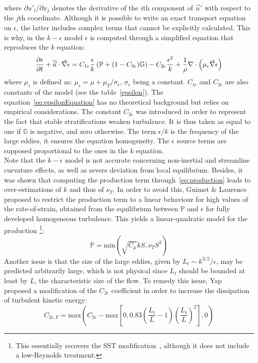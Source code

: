 where $\partial u'_i/\partial x_j$  denotes the derivative of the $i$th component of $\vec u'$ with respect to the $j$th coordinate.
Although it is possible to write an exact transport equation on $\epsilon$, the latter includes complex terms that cannot be explicitly calculated.
This is why, in the $k-\epsilon$ model $\epsilon$ is computed through a simplified equation that reproduces the $k$ equation:
\begin{equation}\label{eq:epsilonEquation}
  \dfrac{\partial\epsilon}{\partial t}+\overline{\vec{u}}\cdot \vec \nabla \epsilon =
C_{1\epsilon}\dfrac{\epsilon}{k}\left(\mathbb P+(1-C_{3\epsilon})\mathbb G\right)  -C_{2\epsilon}\dfrac{\epsilon^2}{k}
+ \dfrac{1}{\rho}\nabla \cdot \left(\mu_\epsilon \vec \nabla \epsilon\right)
\end{equation}
where $\mu_\epsilon$ is defined as: $\mu_\epsilon = \mu+\mu_T/\sigma_\epsilon$, $\sigma_\epsilon$ being a constant.
$C_{1\epsilon}$ and $C_{2\epsilon}$ are also constants of the model (see the table~\ref{epsilon}).
The equation~\eqref{eq:epsilonEquation} has no theoretical background but relies on empirical considerations. The constant $C_{3\epsilon}$ was introduced in order to represent the fact that stable stratifications
weaken turbulence. It is thus taken as equal to one if $\mathbb G$ is negative, and zero otherwise.
The term $\epsilon/k$ is the frequency of the large eddies, it ensures the equation homogeneity.
The $\epsilon$ source terms are supposed proportional to the ones in the $k$ equation.\\

Note that the $k-\epsilon$ model is not accurate concerning non-inertial and streamline curvature effects, as well as severe deviation from local equilibrium.
Besides, it was shown that computing the production term through~\eqref{eq:production} leads to over-estimations of $k$ and thus of $\nu_T$.
In order to avoid this, Guimet \& Laurence~\cite{Guimet2002} proposed to restrict the production term to a linear behaviour for high values of the rate-of-strain,
obtained from the equilibrium between $\mathbb P$ and $\epsilon$ for fully developed homogeneous turbulence.
This yields a linear-quadratic model for the production%
\footnote{This essentially recovers the SST modification~\cite{Menter1994}, although it does not include a low-Reynolds treatment.}:
\begin{equation}\label{eq:P}
\mathbb P = \text{min}\left(\sqrt{C_\mu} k S, \nu_T S^2 \right)
\end{equation}
Another issue is that the size of the large eddies, given by $L_t \sim k^{3/2}/\epsilon$, may be predicted arbitrarily large, which is not physical since $L_t$ should
be bounded at least by $L$, the characteristic size of the flow.
To remedy this issue, Yap~\cite{Yap1987} proposed a modification of the $C_{2\epsilon}$ coefficient in order to increase the dissipation of turbulent kinetic energy:
\begin{equation}\label{eq:Cepsilon2_Yap}
  C_{2\epsilon,Y} = \text{max}\left(C_{2\epsilon} - \text{max}\left[ 0, 0.83\left(\dfrac{L_t}{L}-1\right)\left(\dfrac{L_t}{L}\right)^2 \right],0\right)
\end{equation}

